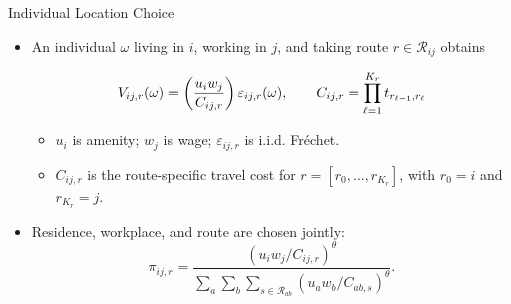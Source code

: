 \documentclass[11pt,aspectratio=169]{beamer}
\newcommand{\R}{\mathcal{R}}
\begin{document}
\begin{frame}{Individual Location Choice}
\begin{itemize}\small
  \item An individual $\omega$ living in $i$, working in $j$, and taking route $r\in\R_{ij}$ obtains
  \vspace{-0.5em}\begin{footnotesize}\begin{equation}\label{eq:routecost}
    V_{ij,r}(\omega) = \left( \frac{u_i w_j}{C_{ij,r}} \right)\varepsilon_{ij,r}(\omega),
    \qquad
    C_{ij,r} = \prod_{\ell=1}^{K_r} t_{r_{\ell-1},r_\ell}
  \vspace{-1.25em}\end{equation}\end{footnotesize}
  \begin{itemize}\footnotesize
    \item $u_i$ is amenity; $w_j$ is wage; $\varepsilon_{ij,r}$ is i.i.d. Fr\'echet.
    \item $C_{ij,r}$ is the route-specific travel cost for $r=[r_0,\ldots,r_{K_r}]$, with $r_0=i$ and $r_{K_r}=j$.
  \end{itemize}
  \vspace{0.25em}
  \item Residence, workplace, and route are chosen jointly:
  \vspace{-0.5em}\begin{equation}\label{eq:pi}
    \pi_{ij,r} = \frac{\left(u_i w_j/C_{ij,r}\right)^\theta}{\sum_{a}\sum_b\sum_{s\in\R_{ab}}\left(u_a w_b/C_{ab,s}\right)^\theta}.
  \end{equation}
\end{itemize}
\end{frame}
\end{document}
